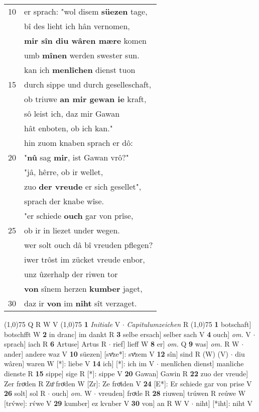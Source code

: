\documentclass[8pt,a4paper,notitlepage]{article}
\begin{document}
\begin{table}[ht]
\begin{minipage}[t]{0.5\linewidth}
\begin{tabular}{rl}
10 & er sprach: "wol disem \textbf{süezen} tage,\\ 
 & bî des lieht ich hân vernomen,\\ 
 & \textbf{mir sîn diu wâren mære} komen\\ 
 & umb \textbf{mînen} werden swester sun.\\ 
 & kan ich \textbf{menlîchen} dienst  tuon\\ 
15 & durch sippe und durch geselleschaft,\\ 
 & ob triuwe \textbf{an mir gewan ie} kraft,\\ 
 & sô leist ich, daz mir Gawan\\ 
 & hât enboten, ob ich kan."\\ 
 & hin zuom knaben sprach er dô:\\ 
20 & "\textbf{nû} sag \textbf{mir}, ist Gawan vrô?"\\ 
 & "jâ, hêrre, ob ir wellet,\\ 
 & zuo \textbf{der vreude} er sich gesellet",\\ 
 & sprach der knabe wîse.\\ 
 & "er schiede \textbf{ouch} gar von prîse,\\ 
25 & ob ir in liezet under wegen.\\ 
 & wer solt ouch dâ bî vreuden pflegen?\\ 
 & iwer trôst im zücket vreude enbor,\\ 
 & unz ûzerhalp der riwen tor\\ 
 & \textbf{von} sînem herzen \textbf{kumber} jaget,\\ 
30 & daz ir \textbf{von} im \textbf{niht} sît verzaget.\\ 
\end{tabular}
\scriptsize
\line(1,0){75} \newline
Q R W V \newline
\line(1,0){75} \newline
\textbf{1} \textit{Initiale} V   $\cdot$ \textit{Capitulumzeichen} R  \newline
\line(1,0){75} \newline
\textbf{1} botschaft] botschfft W \textbf{2} in dranc] im dankt R \textbf{3} selbe ersach] selber sach V \textbf{4} ouch] \textit{om.} V  $\cdot$ sprach] iach R \textbf{6} Artuse] Artus R  $\cdot$ rief] lieff W \textbf{8} er] \textit{om.} Q \textbf{9} was] \textit{om.} R W  $\cdot$ ander] andere waz V \textbf{10} süezen] [svͤze*]: svͤzem V \textbf{12} sîn] sind R (W) (V)  $\cdot$ diu wâren] waren W [*]: liebe V \textbf{14} ich] [*]: ich im V  $\cdot$ menlîchen dienst] manliche dienste R \textbf{15} sippe] sige R [*]: sippe V \textbf{20} Gawan] Gawin R \textbf{22} zuo der vreude] Zer froͯden R Zuͦ froͤden W [Zr]: Ze froͤiden V \textbf{24} [E*]: Er schiede gar von prise V \textbf{26} solt] sol R  $\cdot$ ouch] \textit{om.} W  $\cdot$ vreuden] froͯde R \textbf{28} riuwen] trúwen R reúwe W [trv́we]: rv́we V \textbf{29} kumber] ez kvnber V \textbf{30} von] an R W V  $\cdot$ niht] [*iht]: niht V \newline
\end{minipage}
\end{table}
\end{document}

